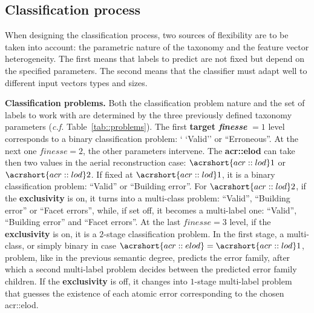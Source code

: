 \documentclass[runningheads]{llncs}
\begin{document}
\subsection{Classification process}

When designing the classification process, two sources of flexibility are to be taken into account: the parametric nature of the taxonomy and the feature vector heterogeneity. The first means that labels to predict are not fixed but depend on the specified parameters. The second means that the classifier must adapt well to different input vectors types and sizes.

\noindent
\textbf{Classification problems.}
Both the classification problem nature and the set of labels to work with are determined by the three previously defined taxonomy parameters (\textit{c.f.} Table~\ref{tab::problems}). The first \textbf{target \textit{finesse}} $= 1$ level corresponds to a binary classification problem: ` `Valid'' or ``Erroneous''. At the next one $\textit{finesse}=2$, the other parameters intervene. The \textbf{\acrshort{acr::elod}} can take then two values in the aerial reconstruction case: $\acrshort{acr::lod}1$ or $\acrshort{acr::lod}2$. If fixed at $\acrshort{acr::lod}1$, it is a binary classification problem: ``Valid'' or ``Building error''. For $\acrshort{acr::lod}2$, if the \textbf{exclusivity} is on, it turns into a multi-class problem: ``Valid'', ``Building error'' or ``Facet errors'', while, if set off, it becomes a multi-label one: ``Valid'', ``Building error'' and ``Facet errors''. At the last $\textit{finesse}=3$ level, if the \textbf{exclusivity} is on, it is a $2$-stage classification problem. In the first stage, a multi-class, or simply binary in case $\acrshort{acr::elod} = \acrshort{acr::lod}1$, problem, like in the previous semantic degree, predicts the error family, after which a second multi-label problem decides between the predicted error family children. If the \textbf{exclusivity} is off, it changes into  $1$-stage multi-label problem that guesses the existence of each atomic error corresponding to the chosen \acrshort{acr::elod}.
\end{document}
